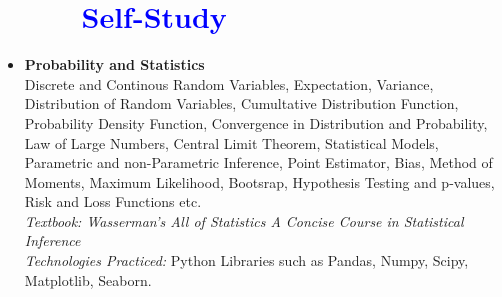 \documentclass[12pt]{article}
\begin{document}
\section*{\textcolor{blue}{\ \ \ \ \  Self-Study}}
\begin{itemize}
    \item[] \textbf{Probability and Statistics}
        \\
        Discrete and Continous Random Variables, Expectation, Variance, Distribution of Random Variables, Cumultative Distribution
        Function, Probability Density Function, Convergence in Distribution and Probability, Law of Large Numbers, Central Limit Theorem,
        Statistical Models, Parametric and non-Parametric Inference, Point Estimator, Bias, Method of Moments, Maximum Likelihood,
        Bootsrap, Hypothesis Testing and p-values, Risk and Loss Functions etc.
        \\
        \textit{Textbook: Wasserman's All of Statistics  A Concise Course in Statistical Inference}
        \\
        \textit{Technologies Practiced:} Python Libraries such as Pandas, Numpy, Scipy, Matplotlib, Seaborn.
\end{itemize}
\end{document}
